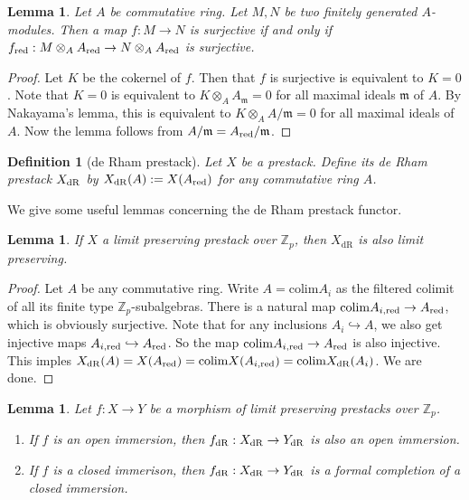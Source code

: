 \documentclass[10pt]{article}
\newtheorem{lem}[thm]{Lemma}
\newtheorem{dfn}[thm]{Definition}
\numberwithin{equation}{section}
\newcommand{\frakm}{{\mathfrak m}}
\newcommand{\bZ}{{\mathbb Z}}
\newcommand{\colim}{{\mathrm{colim}}}       %
\newcommand{\dR}{{\mathrm{dR}}}             %
\begin{document}
\begin{lem}\label{surj-reduced}
    Let $A$ be commutative ring. Let $M,N$ be two finitely generated $A$-modules. Then a map $f:M\to N$ is surjective if and only if $f_{\rm red}:M\otimes_AA_{\rm red}\to N\otimes_AA_{\rm red}$ is surjective.
\end{lem}
\begin{proof}
    Let $K$ be the cokernel of $f$. Then that $f$ is surjective is equivalent to $K=0$. Note that $K=0$ is equivalent to $K\otimes_AA_{\frakm}=0$ for all maximal ideals $\frakm$ of $A$. By Nakayama's lemma, this is equivalent to $K\otimes_AA/\frakm=0$ for all maximal ideals of $A$. Now the lemma follows from $A/\frakm=A_{\rm red}/{\frakm}$. 
\end{proof}

\begin{dfn}[de Rham prestack]
    Let $X$ be a prestack. Define its de Rham prestack $X_{\rm dR}$ by $X_{\rm dR}(A):=X(A_{\rm red})$ for any commutative ring $A$.
\end{dfn}

We give some useful lemmas concerning the de Rham prestack functor.
\begin{lem}\label{limit preserving of dR space}
    If $X$ a limit preserving prestack over $\bZ_p$, then $X_{\dR}$ is also limit preserving.
\end{lem}
\begin{proof}
    Let $A$ be any commutative ring. Write $A=\colim A_i$ as the filtered colimit of all its finite type $\bZ_p$-subalgebras. There is a natural map $\colim A_{i,\rm red}\to A_{\rm red}$, which is obviously surjective. Note that for any inclusions $A_i\hookrightarrow A$, we also get injective maps $A_{i,\rm red}\hookrightarrow A_{\rm red}$. So the map $\colim A_{i,\rm red}\to A_{\rm red}$ is also injective. This imples $X_{\dR}(A)=X(A_{\rm red})=\colim X(A_{i,\rm red})=\colim X_{\rm dR}(A_i)$. We are done.
\end{proof}


\begin{lem}\label{dR-open-closed}
    Let $f:X\to Y$ be a morphism of limit preserving prestacks over $\bZ_p$. 
    \begin{enumerate}
        \item If $f$ is an open immersion, then $f_{\rm dR}:X_{\rm dR}\to Y_{\rm dR}$ is also an open immersion.
        \item If $f$ is a closed immerison, then $f_{\rm dR}:X_{\rm dR}\to Y_{\rm dR}$ is a formal completion of a closed immersion.
    \end{enumerate}
\end{lem}
\end{document}
